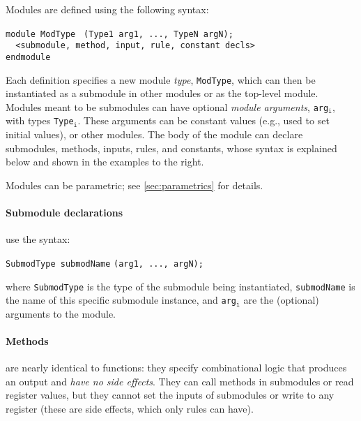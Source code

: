 Modules are defined using the following syntax:
\begin{center}
\verb|module ModType | \optStart \verb|(Type1 arg1, ..., TypeN argN)|\optEnd\verb|;    | \\
\verb|  <submodule, method, input, rule, constant decls> | \\
\verb|endmodule                                          |
\end{center}
Each definition specifies a new module \emph{type}, \verb|ModType|,
which can then be instantiated as a submodule in other modules
or as the top-level module.
Modules meant to be submodules can have optional \emph{module arguments},
\verb|arg|$_{\texttt{i}}$, with types \verb|Type|$_{\texttt{i}}$.
These arguments can be constant values (e.g., used to set initial values),
or other modules.
The body of the module can declare submodules, methods, inputs, rules, and constants,
whose syntax is explained below and shown in the examples to the right.

Modules can be parametric; see \autoref{sec:parametrics} for details.

\paragraph{Submodule declarations} use the syntax:
\begin{center}
  \verb|SubmodType submodName| \optStart \verb|(arg1, ..., argN)|\optEnd\verb|;|
\end{center}
where \verb|SubmodType| is the type of the submodule being instantiated,
\verb|submodName| is the name of this specific submodule instance,
and \verb|arg|$_{\texttt{i}}$ are the (optional) arguments to the module.


\paragraph{Methods} 
are nearly identical to functions:
they specify combinational logic that produces an output
and \emph{have no side effects}.
They can call methods in submodules or read register values,
but they cannot set the inputs of submodules or write to any register
(these are side effects, which only rules can have).

